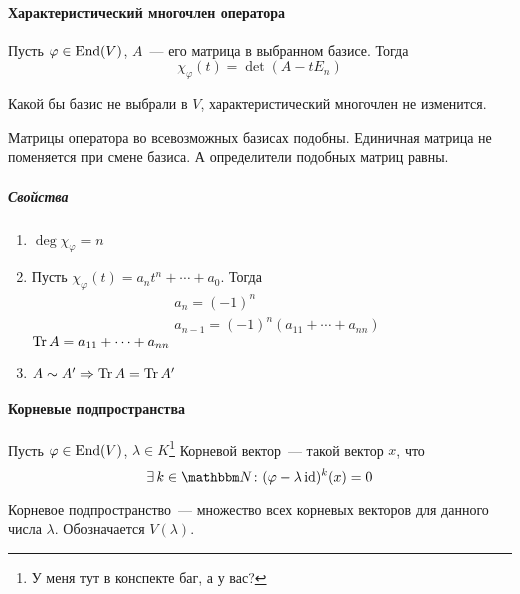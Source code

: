 \documentclass[12pt]{../../../notes}
\begin{document}
\paragraph{Характеристический многочлен оператора}
\begin{defn}\label{defn:linop::charpoly::charpoly}
  Пусть $\varphi\in \operatorname{End}(V)$, $A$~--- его матрица в выбранном базисе.
  Тогда
  \[
    \chi_\varphi(t) = \det (A - t E_n)
  \]
\end{defn}

\begin{stat}\label{stat:linop::charpoly::corr}
  Какой бы базис не выбрали в $V$, характеристический многочлен не изменится.
\end{stat}
\begin{itlproof}
  Матрицы оператора во всевозможных базисах подобны. Единичная матрица не поменяется при смене
  базиса. А определители подобных матриц равны.
\end{itlproof}

\subparagraph{Свойства}
\begin{enumerate}
  \item $\deg \chi_\varphi = n$
  \item Пусть $\chi_\varphi(t) = a_n t^n + \dotsb + a_0$. 
    Тогда
    \begin{align*}
      &a_n = (-1)^n \\
      &a_{n-1} = (-1)^n (a_{11} + \dotsb + a_{nn})
    \end{align*}
    {\label{defn:linop::charpoly::trace} $\operatorname{Tr} A = a_{11} + \dotsb + a_{nn}$ }
  \item $A \sim A' \Rightarrow \operatorname{Tr} A = \operatorname{Tr} A'$
\end{enumerate}

\setcounter{paragraph}{19}
\paragraph{Корневые подпространства}
\begin{defn}\label{defn:linop::rootsp::rootv}
  Пусть $\varphi\in \operatorname{End}(V)$, $\lambda \in K$\footnote{У меня тут в конспекте баг, а у вас?}
  Корневой вектор~--- такой вектор $x$, что
  \[
    \exists\, k \in \N \colon (\varphi -  \lambda \id)^k(x) = 0
  \]
\end{defn}

\begin{defn}\label{defn:linop::rootsp::rootsp}
  Корневое подпространство~--- множество всех корневых векторов для данного числа $\lambda$.
  Обозначается $V(\lambda)$.
\end{defn}
\end{document}
